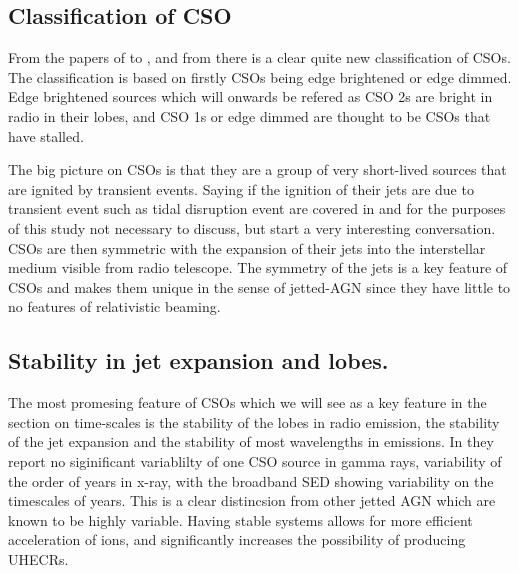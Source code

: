 \subsection{Classification of CSO}
From the papers of \cite{kiehlmann2023compact} to \cite{readhead2023compact}, and from \cite{sullivan2024smallscale} there is a clear quite new classification of CSOs. The classification is based on firstly CSOs being edge brightened or edge dimmed. Edge brightened sources which will onwards be refered as CSO 2s are bright in radio in their lobes, and CSO 1s or edge dimmed are thought to be CSOs that have stalled. 

The big picture on CSOs is that they are a group of very short-lived sources that are ignited by transient events. Saying if the ignition of their jets are due to transient event such as tidal disruption event are covered in \cite{sullivan2024smallscale} and for the purposes of this study not necessary to discuss, but start a very interesting conversation. CSOs are then symmetric with the expansion of their jets into the interstellar medium visible from radio telescope. The symmetry of the jets is a key feature of CSOs and makes them unique in the sense of jetted-AGN since they have little to no features of relativistic beaming.   



\subsection{Stability in jet expansion and lobes.} The most promesing feature of CSOs which we will see as a key feature in the section on time-scales is the stability of the lobes in radio emission, the stability of the jet expansion and the stability of most wavelengths in emissions. In \cite{bronzini2024investigating} they report no siginificant variablilty of one CSO source in gamma rays, variability of the order of years in x-ray, with the broadband SED showing variability on the timescales of years. This is a clear distincsion from other jetted AGN which are known to be highly variable. Having stable systems allows for more efficient acceleration of ions, and significantly increases the possibility of producing UHECRs. 